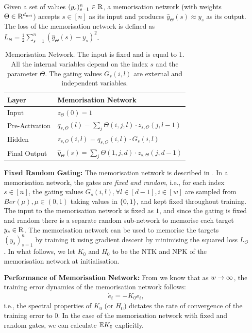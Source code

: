 \begin{appendix}
\begin{definition}
Given a set of values $(y_s)_{s=1}^n\in  \mathrm{R}$, a memorisation network (with weights $\Theta\in\mathrm{R}^{d_{\text{net}}}$) accepts $s\in[n]$ as its input and produces $\hat{y}_{\Theta}(s)\approx y_s$ as its output. The loss of the memorisation network is defined as $L_{\Theta}=\frac{1}{2}\sum_{s=1}^n (\hat{y}_{\Theta}(s)-y_s)^2$.
\end{definition}
\FloatBarrier
\begin{table}[h]
\centering
\begin{tabular}{| l |  l  |}\hline
Layer&  Memorisation Network\\\hline
Input  &$z_{\Theta}(0)=1$ \\
Pre-Activation & $q_{s,\Theta}(l)=\sum_{j}\Theta(i,j,l)\cdot z_{s,\Theta}(j,l-1)$\\
Hidden & $z_{s,\Theta}(i,l)=q_{s,\Theta}(i,l)\cdot G_{s}(i,l)$ \\
Final  Output & $\hat{y}_{\Theta}(s)=\sum_{j} \Theta(1,j,d) \cdot z_{s,\Theta}(j,d-1)$\\\hline
\end{tabular}
\caption{ Memorisation Network. The input is fixed and is equal to $1$. All the internal variables depend on the index $s$ and the parameter $\Theta$. The gating values $G_s(i,l)$ are external and independent variables.}
\label{tb:dgnmemo}
\end{table}

\textbf{Fixed Random Gating:} The memorisation network is described in . In a memorisation network, the gates are \emph{fixed and random}, i.e., for each index $s\in[n]$, the gating values $G_{s}(i,l),\forall l\in[d-1], i\in[w] $ are sampled from $Ber(\mu), \mu\in(0,1)$ taking values in $\{0,1\}$,  and kept fixed throughout training. The input to the memorisation network is fixed as $1$, and since the gating is fixed and random there is a separate random sub-network to memorise each target $y_s\in\mathrm{R}$. The memorisation network can be used to memorise the targets  $(y_s)_{s=1}^n$ by training it using gradient descent by minimising the squared loss $L_{\Theta}$. In what follows, we let $K_0$ and $H_0$ to be the NTK and NPK of the memorisation network at initialisation.


\textbf{Performance of Memorisation Network:} From  we know that as $w\rightarrow\infty$, the training error dynamics of the memorisation network follows:
\begin{align}
\dot{e}_t=-K_{0} e_t,
\end{align}
i.e., the spectral properties of $K_0$ (or $H_0$) dictates the rate of convergence of the training error to $0$. In the case of the memorisation network with fixed and random gates, we can calculate $\mathbb{E}{K_0}$ explicitly. 


\end{appendix}
